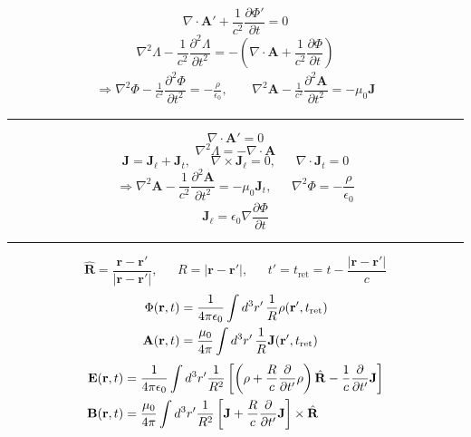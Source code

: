 \documentclass[twocolumn]{article}
\newcommand{\0}{\textcolor{gray}{0}}
\newcommand{\gr}{\nabla}
\newcommand{\di}{\nabla\cdot}
\newcommand{\ro}{\nabla\times}
\newcommand{\la}{\nabla^2}
\newcommand{\rv}{\mathbf{r}}
\newcommand{\Rhat}{\hat{\mathbf{R}}}
\newcommand{\eo}{\epsilon_{0}}
\newcommand{\uo}{\mu_{0}}
\newcommand{\rdif}{\rv - \rv'}
\newcommand{\pd}[2]{\dfrac{\partial #1}{\partial #2}}
\newcommand{\n}[1]{\mathbf{#1}}
\begin{document}
\begin{equation*}
	\di\n{A}' + \frac{1}{c^2}\pd{\Phi'}{t} = 0
\end{equation*}
\begin{equation*}
	\la\Lambda - \frac{1}{c^2}\pd{^2\Lambda}{t^2} = - \left(\di\n{A} + \frac{1}{c^2}\pd{\Phi}{t}\right)
\end{equation*}
\begin{align*}
	\Rightarrow \la\Phi - \frac{1}{c^2}\pd{^2\Phi}{t^2} = -\frac{\rho}{\eo}, ~~~~~& \la\n{A} - \frac{1}{c^2}\pd{^2\n{A}}{t^2} = -\uo\n{J}
\end{align*}
\vspace{-2mm}\hrule\vspace{1mm}
\begin{equation*}
	\di\n{A}' = 0
\end{equation*}
\begin{equation*}
	\la\Lambda = - \di\n{A}
\end{equation*}
\begin{equation*}
	\n{J} = \n{J}_{\ell} + \n{J}_{t}, ~~~~~~~ \ro\n{J}_{\ell} = 0, ~~~~~~~ \di\n{J}_{t} = 0
\end{equation*}
\begin{equation*}
	\Rightarrow\la\n{A} - \frac{1}{c^2}\pd{^2\n{A}}{t^2} = -\uo\n{J}_{t}, ~~~~~~~ \la\Phi = - \frac{\rho}{\eo}
\end{equation*}
\begin{equation*}
	\n{J}_{\ell} = \eo\gr\pd{\Phi}{t}
\end{equation*}
\hrule
\begin{equation*}
	\Rhat = \frac{\rdif}{|\rdif|}, ~~~~~~~ R = |\rdif|, ~~~~~~~ t' = t_{\mathrm{ret}} =  t - \frac{|\rdif|}{c}
\end{equation*}
\vspace{-6mm}
\begin{align*}
	\Phi(\rv,t)  &= \ke \int d^3r' \, \frac{1}{R} \rho (\rv',t_{\mathrm{ret}})\\
	\n{A}(\rv,t) &= \ku \int d^3r' \, \frac{1}{R} \n{J}(\rv',t_{\mathrm{ret}})
\end{align*}
\vspace{-4mm}
\begin{align*}
	\n{E}(\rv,t) &= \ke \int d^3r' \frac{1}{R^2}\left[\left(\rho + \frac{R}{c} \pd{}{t'}\rho\right)\Rhat - \frac{1}{c}\pd{}{t'}\n{J} \right]\\
	\n{B}(\rv,t) &= \ku \int d^3r' \frac{1}{R^2}\left[\n{J} + \frac{R}{c}\pd{}{t'}\n{J}\right]\times\Rhat
\end{align*}
\end{document}
